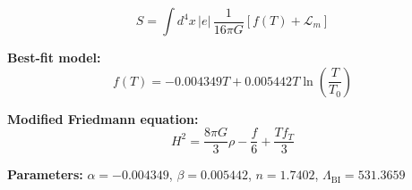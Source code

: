 
\begin{equation}
  S = \int d^4x \, |e| \, \frac{1}{16\pi G} \left[ f(T) + \mathcal{L}_m \right]
\end{equation}

\textbf{Best-fit model:}
\begin{equation}
  f(T) = -0.004349 T + 0.005442 T \ln\!\left(\frac{T}{T_0}\right)
\end{equation}

\textbf{Modified Friedmann equation:}
\begin{equation}
  H^2 = \frac{8\pi G}{3} \rho - \frac{f}{6} + \frac{T f_T}{3}
\end{equation}

\textbf{Parameters:}
$\alpha = -0.004349$, \quad
$\beta = 0.005442$, \quad
$n = 1.7402$, \quad
$\Lambda_{\text{BI}} = 531.3659$